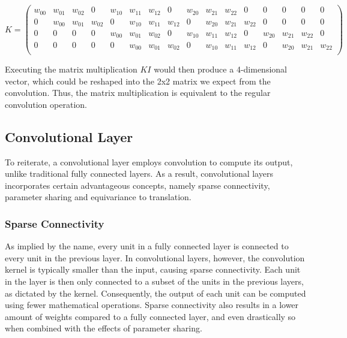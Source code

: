 \[
    K = 
    \left(
    \begin{smallmatrix}
    \textit{$w_{00}$} & \textit{$w_{01}$} & \textit{$w_{02}$} & 0 & \textit{$w_{10}$} & \textit{$w_{11}$} & \textit{$w_{12}$} & 0 & \textit{$w_{20}$} & \textit{$w_{21}$} & \textit{$w_{22}$} & 0 & 0 & 0 & 0 & 0 \\
    0 & \textit{$w_{00}$} & \textit{$w_{01}$} & \textit{$w_{02}$} & 0 & \textit{$w_{10}$} & \textit{$w_{11}$} & \textit{$w_{12}$} & 0 & \textit{$w_{20}$} & \textit{$w_{21}$} & \textit{$w_{22}$} & 0 & 0 & 0 & 0 \\
    0 & 0 & 0 & 0 & \textit{$w_{00}$} & \textit{$w_{01}$} & \textit{$w_{02}$} & 0 & \textit{$w_{10}$} & \textit{$w_{11}$} & \textit{$w_{12}$} & 0 & \textit{$w_{20}$} & \textit{$w_{21}$} & \textit{$w_{22}$} & 0 \\
    0 & 0 & 0 & 0 & 0 & \textit{$w_{00}$} & \textit{$w_{01}$} & \textit{$w_{02}$} & 0 & \textit{$w_{10}$} & \textit{$w_{11}$} & \textit{$w_{12}$} & 0 & \textit{$w_{20}$} & \textit{$w_{21}$} & \textit{$w_{22}$} \\
    \end{smallmatrix}
    \right)
\]

\noindent Executing the matrix multiplication $KI$ would then produce a 4-dimensional vector, which could be reshaped into the 2x2 matrix we expect from the convolution. Thus, the matrix multiplication is equivalent to the regular convolution operation.

\subsection{Convolutional Layer}

To reiterate, a convolutional layer employs convolution to compute its output, unlike traditional fully connected layers. As a result, convolutional layers incorporates certain advantageous concepts, namely sparse connectivity, parameter sharing and equivariance to translation.

\subsubsection{Sparse Connectivity}

As implied by the name, every unit in a fully connected layer is connected to every unit in the previous layer. In convolutional layers, however, the convolution kernel is typically smaller than the input, causing sparse connectivity. Each unit in the layer is then only connected to a subset of the units in the previous layers, as dictated by the kernel. Consequently, the output of each unit can be computed using fewer mathematical operations. Sparse connectivity also results in a lower amount of weights compared to a fully connected layer, and even drastically so when combined with the effects of parameter sharing.

